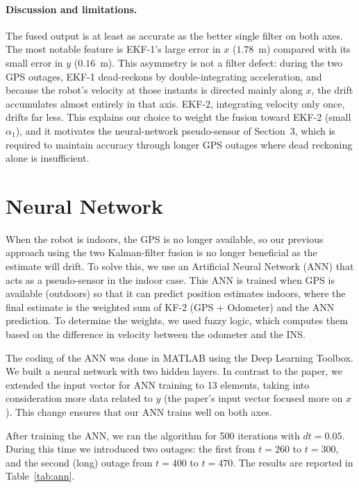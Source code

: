 \documentclass[11pt,a4paper]{article}
\begin{document}
\paragraph{Discussion and limitations.}
The fused output is at least as accurate as the better single filter on both axes.
The most notable feature is EKF-1's large error in $x$ ($1.78$~m) compared with its
small error in $y$ ($0.16$~m). This asymmetry is not a filter defect: during the two
GPS outages, EKF-1 dead-reckons by double-integrating acceleration, and because the
robot's velocity at those instants is directed mainly along $x$, the drift
accumulates almost entirely in that axis. EKF-2, integrating velocity only once,
drifts far less. This explains our choice to weight the fusion toward EKF-2 (small
$\alpha_1$), and it motivates the neural-network pseudo-sensor of Section~3, which is
required to maintain accuracy through longer GPS outages where dead reckoning alone
is insufficient.

\section{Neural Network}

When the robot is indoors, the GPS is no longer available, so our previous approach
using the two Kalman-filter fusion is no longer beneficial as the estimate will
drift. To solve this, we use an Artificial Neural Network (ANN) that acts as a
pseudo-sensor in the indoor case. This ANN is trained when GPS is available
(outdoors) so that it can predict position estimates indoors, where the final
estimate is the weighted sum of KF-2 (GPS + Odometer) and the ANN prediction. To
determine the weights, we used fuzzy logic, which computes them based on the
difference in velocity between the odometer and the INS.

The coding of the ANN was done in MATLAB using the Deep Learning Toolbox. We built a
neural network with two hidden layers. In contrast to the paper, we extended the
input vector for ANN training to 13 elements, taking into consideration more data
related to $y$ (the paper's input vector focused more on $x$). This change ensures
that our ANN trains well on both axes.

After training the ANN, we ran the algorithm for 500 iterations with $dt = 0.05$.
During this time we introduced two outages: the first from $t=260$ to $t=300$, and
the second (long) outage from $t=400$ to $t=470$. The results are reported in
Table~\ref{tab:ann}.
\end{document}
